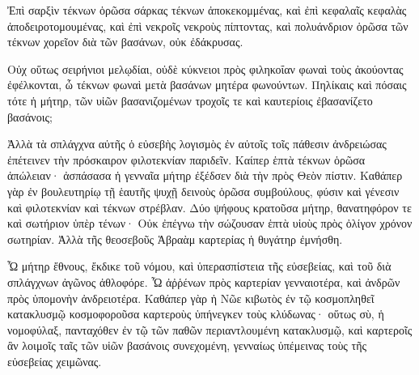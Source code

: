 {Ἐπὶ σαρξὶν τέκνων ὁρῶσα σάρκας τέκνων ἀποκεκομμένας, καὶ ἐπὶ κεφαλαῖς κεφαλὰς ἀποδειροτομουμένας, καὶ ἐπὶ νεκροῖς νεκροὺς πίπτοντας, καὶ πολυάνδριον ὁρῶσα τῶν τέκνων χορεῖον διὰ τῶν βασάνων, οὐκ ἐδάκρυσας.
\par }{\PP {}Οὐχ οὕτως σειρήνιοι μελῳδίαι, οὐδὲ κύκνειοι πρὸς φιληκοΐαν φωναὶ τοὺς ἀκούοντας ἐφέλκονται, ὦ τέκνων φωναὶ μετὰ βασάνων μητέρα φωνούντων.
Πηλίκαις καὶ πόσαις τότε ἡ μήτηρ, τῶν υἱῶν βασανιζομένων τροχοῖς τε καὶ καυτερίοις ἐβασανίζετο βασάνοις;
\par }{\PP {}Ἀλλὰ τὰ σπλάγχνα αὐτῆς ὁ εὐσεβὴς λογισμὸς ἐν αὐτοῖς τοῖς πάθεσιν ἀνδρειώσας ἐπέτεινεν τὴν πρόσκαιρον φιλοτεκνίαν παριδεῖν.
Καίπερ ἑπτὰ τέκνων ὁρῶσα ἀπώλειαν· ἀσπάσασα ἡ γενναῖα μήτηρ ἐξέδσεν διὰ τὴν πρὸς Θεὸν πίστιν.
Καθάπερ γὰρ ἐν βουλευτηρίῳ τῇ ἑαυτῆς ψυχῇ δεινοὺς ὁρῶσα συμβούλους, φύσιν καὶ γένεσιν καὶ φιλοτεκνίαν καὶ τέκνων στρέβλαν.
Δύο ψήφους κρατοῦσα μήτηρ, θανατηφόρον τε καὶ σωτήριον ὑπὲρ τένων·
Οὐκ ἐπέγνω τὴν σώζουσαν ἑπτὰ υἱοὺς πρὸς ὀλίγον χρόνον σωτηρίαν.
Ἀλλὰ τῆς θεοσεβοῦς Ἁβραὰμ καρτερίας ἡ θυγάτηρ ἐμνήσθη.
\par }{\PP {}Ὦ μήτηρ ἔθνους, ἔκδικε τοῦ νόμου, καὶ ὑπερασπίστεια τῆς εὐσεβείας, καὶ τοῦ διὰ σπλάγχνων ἀγῶνος ἀθλοφόρε.
Ὦ ἀῤῥένων πρὸς καρτερίαν γενναιοτέρα, καὶ ἀνδρῶν πρὸς ὑπομονὴν ἀνδρειοτέρα.
Καθάπερ γὰρ ἡ Νῶε κιβωτὸς ἐν τῷ κοσμοπληθεῖ κατακλυσμῷ κοσμοφοροῦσα καρτεροὺς ὑπήνεγκεν τοὺς κλύδωνας·
οὕτως σὺ, ἡ νομοφύλαξ, πανταχόθεν ἐν τῷ τῶν παθῶν περιαντλουμένη κατακλυσμῷ, καὶ καρτεροῖς ἂν λοιμοῖς ταῖς τῶν υἱῶν βασάνοις συνεχομένη, γενναίως ὑπέμεινας τοὺς τῆς εὐσεβείας χειμῶνας.

}
